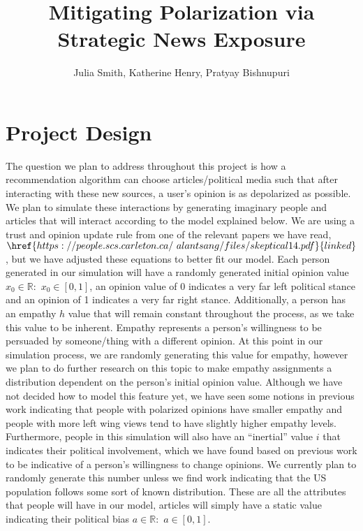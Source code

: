 \documentclass[11pt,reqno]{proc}
\begin{document}
\title{Mitigating Polarization via Strategic News Exposure} 
\author{Julia Smith, Katherine Henry, Pratyay Bishnupuri}
\makeatother
\maketitle

\section {Project Design} 
\hspace{\parindent} The question we plan to address throughout this project is how a recommendation algorithm can choose articles/political media such that after interacting with these new sources, a user’s opinion is as depolarized as possible. We plan to simulate these interactions by generating imaginary people and articles that will interact according to the model explained below. We are using a trust and opinion update rule from one of the relevant papers we have read, $\href{https://people.scs.carleton.ca/~alantsang/files/skeptical14.pdf}{linked}$, but we have adjusted these equations to better fit our model. Each person generated in our simulation will have a randomly generated initial opinion value $x_0 \in \mathbb{R}:$ $x_0 \in [0,1]$, an opinion value of 0 indicates a very far left political stance and an opinion of 1 indicates a very far right stance. Additionally, a person has an empathy $h$ value that will remain constant throughout the process, as we take this value to be inherent. Empathy represents a person’s willingness to be persuaded by someone/thing with a different opinion. At this point in our simulation process, we are randomly generating this value for empathy, however we plan to do further research on this topic to make empathy assignments a distribution dependent on the person’s initial opinion value. Although we have not decided how to model this feature yet, we have seen some notions in previous work indicating that people with polarized opinions have smaller empathy and people with more left wing views tend to have slightly higher empathy levels. Furthermore, people in this simulation will also have an “inertial” value $i$ that indicates their political involvement, which we have found based on previous work to be indicative of a person’s willingness to change opinions. We currently plan to randomly generate this number unless we find work indicating that the US population follows some sort of known distribution. These are all the attributes that people will have in our model, articles will simply have a static value indicating their political bias $a \in \mathbb{R}:$ $a \in [0,1]$.
\end{document}
